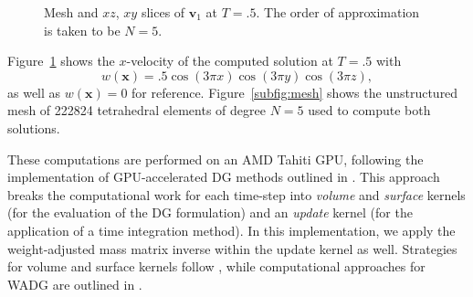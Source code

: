\documentclass{siamart0216}
\begin{document}
\begin{figure}
\centering
{}
\hspace{.5em}
\caption{Mesh and $xz$, $xy$ slices of $\bm{v}_1$ at $T = .5$.  The order of approximation is taken to be $N=5$.  }
\label{fig:3d}
\end{figure}
Figure~\ref{fig:3d} shows the $x$-velocity of the computed solution at $T = .5$ with
\[
w(\bm{x}) = .5 \cos(3\pi x)\cos(3\pi y)\cos(3\pi z), 
\]  
as well as $w(\bm{x}) = 0$ for reference.  Figure~\ref{subfig:mesh} shows the unstructured mesh of 222824 tetrahedral elements of degree $N=5$ used to compute both solutions. 

 These computations are performed on an AMD Tahiti GPU, following the implementation of GPU-accelerated DG methods outlined in \cite{klockner2009nodal}.  This approach breaks the computational work for each time-step into \emph{volume} and \emph{surface} kernels (for the evaluation of the DG formulation) and an \emph{update} kernel (for the application of a time integration method).    In this implementation, we apply the weight-adjusted mass matrix inverse within the update kernel as well.  Strategies for volume and surface kernels follow \cite{klockner2009nodal}, while computational approaches for WADG are outlined in \cite{chan2016weight2}.  
\end{document}
